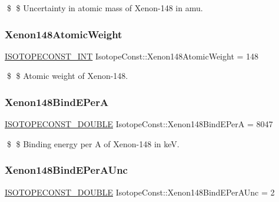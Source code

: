 \$ \$ Uncertainty in atomic mass of Xenon-\/148 in amu. \mbox{\label{group___isotope_const-_xenon-_xe148_ga98837a609ded2ca75b393d8c63d91ac8}} 
\subsubsection{\texorpdfstring{Xenon148\+Atomic\+Weight}{Xenon148AtomicWeight}}
{\footnotesize\ttfamily \mbox{\hyperlink{group___isotope_const-_macros_ga5f18360b3e99483a35c32d789e62621c}{I\+S\+O\+T\+O\+P\+E\+C\+O\+N\+S\+T\+\_\+\+I\+NT}} Isotope\+Const\+::\+Xenon148\+Atomic\+Weight = 148}

\$ \$ Atomic weight of Xenon-\/148. \mbox{\label{group___isotope_const-_xenon-_xe148_ga83f8c34497f902e62b0b2aeb1aeffdfd}} 
\subsubsection{\texorpdfstring{Xenon148\+Bind\+E\+PerA}{Xenon148BindEPerA}}
{\footnotesize\ttfamily \mbox{\hyperlink{group___isotope_const-_macros_ga8f45a7272ce02c0b4c65c44636ed719a}{I\+S\+O\+T\+O\+P\+E\+C\+O\+N\+S\+T\+\_\+\+D\+O\+U\+B\+LE}} Isotope\+Const\+::\+Xenon148\+Bind\+E\+PerA = 8047}

\$ \$ Binding energy per A of Xenon-\/148 in keV. \mbox{\label{group___isotope_const-_xenon-_xe148_gaace8892c3eda3fe3cee30a78f1037eda}} 
\subsubsection{\texorpdfstring{Xenon148\+Bind\+E\+Per\+A\+Unc}{Xenon148BindEPerAUnc}}
{\footnotesize\ttfamily \mbox{\hyperlink{group___isotope_const-_macros_ga8f45a7272ce02c0b4c65c44636ed719a}{I\+S\+O\+T\+O\+P\+E\+C\+O\+N\+S\+T\+\_\+\+D\+O\+U\+B\+LE}} Isotope\+Const\+::\+Xenon148\+Bind\+E\+Per\+A\+Unc = 2}


